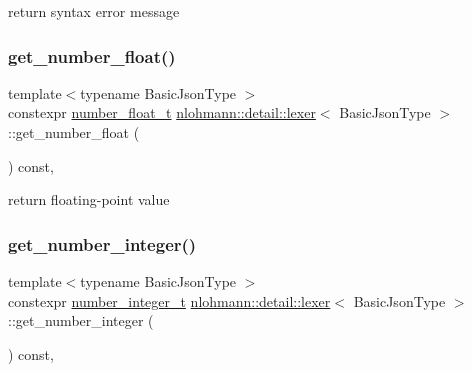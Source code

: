 return syntax error message 

\mbox{\label{classnlohmann_1_1detail_1_1lexer_ac013af35a21e9387993b19da5b3e0ae2}} 
\subsubsection{\texorpdfstring{get\_number\_float()}{get\_number\_float()}}
{\footnotesize\ttfamily template$<$typename Basic\+Json\+Type $>$ \\
constexpr \mbox{\hyperlink{classnlohmann_1_1detail_1_1lexer_aa7f9e7b2bcd311fb86e2da43761a6619}{number\+\_\+float\+\_\+t}} \mbox{\hyperlink{classnlohmann_1_1detail_1_1lexer}{nlohmann\+::detail\+::lexer}}$<$ Basic\+Json\+Type $>$\+::get\+\_\+number\+\_\+float (\begin{DoxyParamCaption}{ }\end{DoxyParamCaption}) const\hspace{0.3cm}{\ttfamily [inline]}, {\ttfamily [noexcept]}}



return floating-\/point value 

\mbox{\label{classnlohmann_1_1detail_1_1lexer_afa338d17c0a7e834c73104258a2c8ced}} 
\subsubsection{\texorpdfstring{get\_number\_integer()}{get\_number\_integer()}}
{\footnotesize\ttfamily template$<$typename Basic\+Json\+Type $>$ \\
constexpr \mbox{\hyperlink{classnlohmann_1_1detail_1_1lexer_a9cd1b11cc67edbfb2613c788b5bd337c}{number\+\_\+integer\+\_\+t}} \mbox{\hyperlink{classnlohmann_1_1detail_1_1lexer}{nlohmann\+::detail\+::lexer}}$<$ Basic\+Json\+Type $>$\+::get\+\_\+number\+\_\+integer (\begin{DoxyParamCaption}{ }\end{DoxyParamCaption}) const\hspace{0.3cm}{\ttfamily [inline]}, {\ttfamily [noexcept]}}



